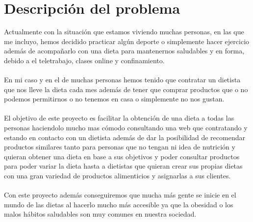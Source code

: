 \chapter{Descripción del problema}

Actualmente con la situación que estamos viviendo muchas personas, en las que me incluyo, hemos 
decidido practicar algún deporte o simplemente hacer ejercicio además de acompañarlo con una dieta 
para mantenernos saludables y en forma, debido a el teletrabajo, clases online y confinamiento.
\\\\
En mi caso y en el de muchas personas hemos tenido que contratar un dietista que nos lleve la dieta 
cada mes además de tener que comprar productos que o no podemos permitirnos o no tenemos en casa o 
simplemente no nos gustan.
\\\\
El objetivo de este proyecto es facilitar la obtención de una dieta a todas las personas haciendolo mucho 
mas cómodo consultando una web que contratando y estando en contacto con un dietista además de dar la posibilidad 
de recomendar productos similares tanto para personas que no tengan ni idea de nutrición y quieran obtener una dieta 
en base a sus objetivos y poder consultar productos para poder variar la dieta hasta a dietistas que quieran crear
sus propias dietas con una gran variedad de productos alimenticios y asignarlas a sus clientes.
\\\\
Con este proyecto además conseguiremos que mucha más gente se inicie en el mundo de las dietas al hacerlo mucho 
más accesible ya que la obesidad o los malos hábitos saludables son muy comunes en nuestra sociedad.